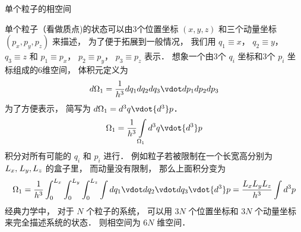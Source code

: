 
单个粒子的相空间

单个粒子（看做质点)的状态可以由3个位置坐标 $\left( {x,y,z} \right)$ 和三个动量坐标 $\left( {{p_x},{p_y},{p_z}} \right)$ 来描述， 为了便于拓展到一般情况， 我们用 ${q_1} \equiv x$，   ${q_2} \equiv y$， ${q_3} \equiv z$   和 ${p_1} \equiv {p_x}$，   ${p_2} \equiv {p_y}$， ${p_3} \equiv {p_z}$   表示． 想象一个由3个 ${q_i}$  坐标和3个 ${p_i}$  坐标组成的6维空间， 体积元定义为
 \begin{equation}
d{\Omega_1} = \frac{1}{{{h^3}}}d{q_1}d{q_2}d{q_3} \vdot d{p_1}d{p_2}d{p_3}
\end{equation} 
为了方便表示， 简写为  $d{\Omega_1} = {d^3}q \vdot {d^3}p$． 
  \begin{equation}
{\Omega_1} = \frac{1}{{{h^3}}}\int\limits_{{\Omega_1}} {{d^3}q \vdot {d^3}p} 
\end{equation} 
积分对所有可能的 ${q_i}$ 和 ${p_i}$ 进行． 例如粒子若被限制在一个长宽高分别为 ${L_x},{\kern 1pt} {L_y},{L_z}$ 的盒子里， 而动量没有限制， 那么上面积分变为
  \begin{equation}
{\Omega_1} = \frac{1}{{{h^3}}}\int_0^{{L_x}} {\int_0^{{L_y}} {\int_0^{{L_z}} {\int {d{q_1} \vdot d{q_2} \vdot d{q_3}} } }  \vdot {d^3}p}  = \frac{{{L_x}{L_y}{L_z}}}{{{h^3}}}\int {{d^3}p} 
\end{equation} 
经典力学中， 对于 $N$ 个粒子的系统， 可以用 $3N$ 个位置坐标和 $3N$ 个动量坐标来完全描述系统的状态． 则相空间为 $6N$ 维空间．
